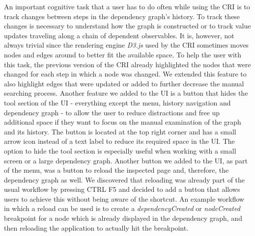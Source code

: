An important cognitive task that a user has to do often while using the CRI is to track changes between steps in the dependency graph's history. To track these changes is necessary to understand how the graph is constructed or to track value updates traveling along a chain of dependent observables. It is, however, not always trivial since the rendering engine \emph{D3.js} \cite{D3JS} used by the CRI sometimes moves nodes and edges around to better fit the available space. To help the user with this task, the previous version of the CRI already highlighted the nodes that were changed for each step in which a node was changed. We extended this feature to also highlight edges that were updated or added to further decrease the manual searching process. Another feature we added to the UI is a button that hides the tool section of the UI - everything except the menu, history navigation and dependency graph - to allow the user to reduce distractions and free up additional space if they want to focus on the manual examination of the graph and its history. The button is located at the top right corner and has a small arrow icon instead of a text label to reduce its required space in the UI. The option to hide the tool section is especially useful when working with a small screen or a large dependency graph. Another button we added to the UI, as part of the menu, was a button to reload the inspected page and, therefore, the dependency graph as well. We discovered that reloading was already part of the usual workflow by pressing CTRL F5 and decided to add a button that allows users to achieve this without being aware of the shortcut. An example workflow in which a reload can be used is to create a \emph{dependencyCreated} or \emph{nodeCreated} breakpoint for a node which is already displayed in the dependency graph, and then reloading the application to actually hit the breakpoint.
